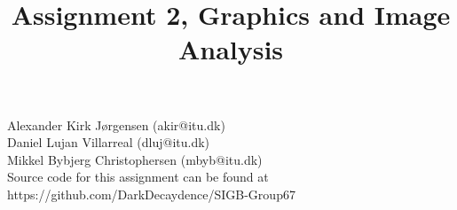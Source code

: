 \documentclass{article}
\title{Assignment 2, Graphics and Image Analysis}
\begin{document}
	\maketitle
	\begin{center}
	Alexander Kirk Jørgensen (akir@itu.dk)\\
	Daniel Lujan Villarreal (dluj@itu.dk)\\
	Mikkel Bybjerg Christophersen (mbyb@itu.dk)\\[0.5cm]
	Source code for this assignment can be found at https://github.com/DarkDecaydence/SIGB-Group67
		
	\newpage
	\tableofcontents
	\newpage
	\end{center}
	
	
	
\end{document}
